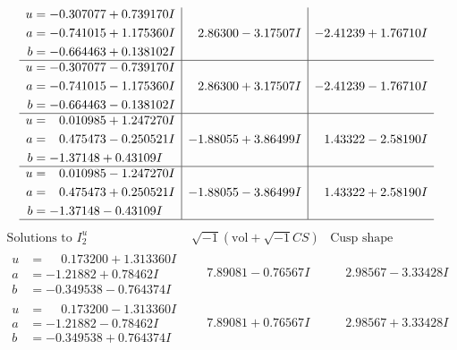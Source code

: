 \documentclass[1p]{elsarticle_modified}
\theoremstyle{definition}
\newcommand{\I}{\sqrt{-1}}
\begin{document}
$$\begin{array}{c|c|c}
\begin{aligned}
u &= -0.307077 + 0.739170 I \\
a &= -0.741015 + 1.175360 I \\
b &= -0.664463 + 0.138102 I\end{aligned}
 & \phantom{-}2.86300 - 3.17507 I & -2.41239 + 1.76710 I \\ \hline\begin{aligned}
u &= -0.307077 - 0.739170 I \\
a &= -0.741015 - 1.175360 I \\
b &= -0.664463 - 0.138102 I\end{aligned}
 & \phantom{-}2.86300 + 3.17507 I & -2.41239 - 1.76710 I \\ \hline\begin{aligned}
u &= \phantom{-}0.010985 + 1.247270 I \\
a &= \phantom{-}0.475473 - 0.250521 I \\
b &= -1.37148 + 0.43109 I\end{aligned}
 & -1.88055 + 3.86499 I & \phantom{-}1.43322 - 2.58190 I \\ \hline\begin{aligned}
u &= \phantom{-}0.010985 - 1.247270 I \\
a &= \phantom{-}0.475473 + 0.250521 I \\
b &= -1.37148 - 0.43109 I\end{aligned}
 & -1.88055 - 3.86499 I & \phantom{-}1.43322 + 2.58190 I\\
 \hline 
 \end{array}$$\newpage$$\begin{array}{c|c|c}  
\text{Solutions to }I^u_{2}& \I (\text{vol} + \sqrt{-1}CS) & \text{Cusp shape}\\
 \hline 
\begin{aligned}
u &= \phantom{-}0.173200 + 1.313360 I \\
a &= -1.21882 + 0.78462 I \\
b &= -0.349538 - 0.764374 I\end{aligned}
 & \phantom{-}7.89081 - 0.76567 I & \phantom{-}2.98567 - 3.33428 I \\ \hline\begin{aligned}
u &= \phantom{-}0.173200 - 1.313360 I \\
a &= -1.21882 - 0.78462 I \\
b &= -0.349538 + 0.764374 I\end{aligned}
 & \phantom{-}7.89081 + 0.76567 I & \phantom{-}2.98567 + 3.33428 I \\ \hline\begin{aligned}

\end{aligned}
\end{array}$$
\end{document}
